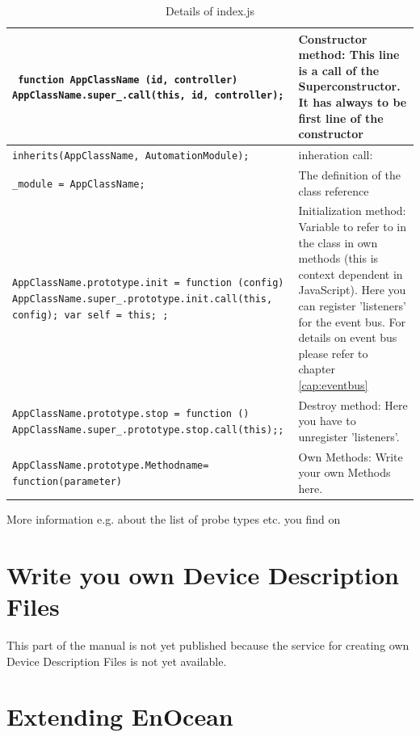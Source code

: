 \begin{table}
\begin{tabular}{|p{}|p{}|}
\hline
\texttt{\tiny 
function AppClassName (id, controller) {AppClassName.super\_.call(this, id, controller);} }&
Constructor method:
This line is a call of the Superconstructor. It has always to be first line of the constructor \\
\hline
\texttt{\tiny inherits(AppClassName, AutomationModule); }
&
inheration call: \\
\hline
\texttt{\tiny \_module = AppClassName;} &
The definition of the class reference \\
\hline
\texttt{\tiny AppClassName.prototype.init = function (config) {
AppClassName.super\_.prototype.init.call(this, config);
var self = this; }; }&
Initialization method: Variable to refer to in the class in own
methods (this is context dependent in JavaScript).
Here you can register 'listeners' for the event bus. For details on event bus please 
refer to chapter \ref{cap:eventbus} \\
\hline

\texttt{\tiny AppClassName.prototype.stop = function () {
AppClassName.super\_.prototype.stop.call(this);}; }&
Destroy method:
Here you have to unregister 'listeners'.  \\
\hline
\texttt{\tiny AppClassName.prototype.Methodname=
function(parameter) }&
Own Methods: Write your own Methods here. \\
\hline
\end{tabular}
\caption{Details of index.js} 
\label{tab:detailindexjs}
\end{table}	
	

More information e.g. about the list of probe types etc. you find on 


\section{Write you own Device Description Files}
\label {newddr} 

This part of the manual is not yet published because the service for creating own Device 
Description Files is not yet available.

\section{Extending EnOcean}
\label{addenocean}

